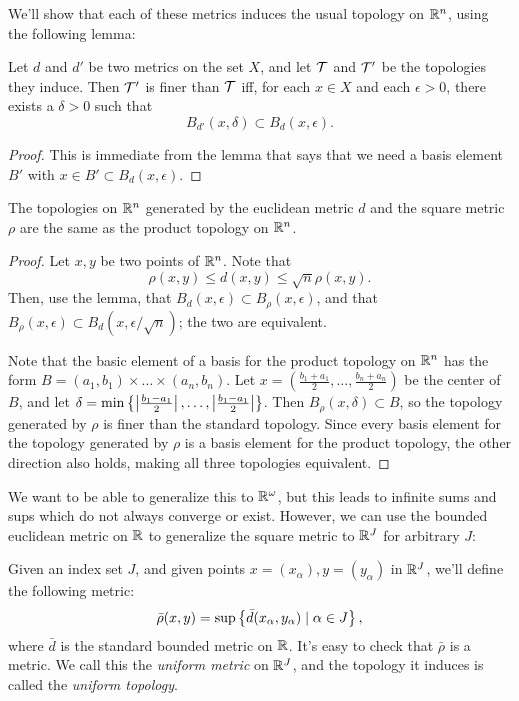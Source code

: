\documentclass[10pt]{report}
\begin{document}
We'll show that each of these metrics induces the usual topology on $\mathbb{R}^n$, using the following lemma:

\begin{lemma}
  Let $d$ and $d'$ be two metrics on the set $X$, and let $\mathcal{T}$ and $\mathcal{T}'$ be the topologies they induce.
  Then $\mathcal{T}'$ is finer than $\mathcal{T}$ iff, for each $x \in X$ and each $\epsilon > 0$, there exists a $\delta > 0$ such that
  \[ B_{d'}(x,\delta) \subset B_d(x,\epsilon).\]
\end{lemma}
\begin{proof}
  This is immediate from the lemma that says that we need a basis element $B'$ with $x \in B' \subset B_d(x,\epsilon)$. 
\end{proof}

\begin{theorem}
  The topologies on $\mathbb{R}^n$ generated by the euclidean metric $d$ and the square metric $\rho$ are the same as the product topology on $\mathbb{R}^n$.
\end{theorem}
\begin{proof}
  Let $x,y$ be two points of $\mathbb{R}^n$.
  Note that
  \[ \rho(x,y) \leq d(x,y) \leq \sqrt{n} \rho(x,y) .\]
  Then, use the lemma, that $B_d(x,\epsilon) \subset B_\rho(x,\epsilon)$, and that $B_\rho(x,\epsilon) \subset B_d(x,\epsilon/\sqrt{n})$; the two are equivalent.

  Note that the basic element of a basis for the product topology on $\mathbb{R}^n$ has the form $B = (a_1,b_1)\times\dots\times(a_n,b_n)$.
  Let $x = (\frac{b_1 + a_1}{2},\dots,\frac{b_n + a_n}{2})$ be the center of $B$, and let $\delta = \min \left\{ \left| \frac{b_1 - a_1}{2} \right|,\dots,\left| \frac{b_1 - a_1}{2} \right| \right\}$.
  Then $B_\rho(x,\delta) \subset B$, so the topology generated by $\rho$ is finer than the standard topology.
  Since every basis element for the topology generated by $\rho$ is a basis element for the product topology, the other direction also holds, making all three topologies equivalent.
\end{proof}

We want to be able to generalize this to $\mathbb{R}^\omega$, but this leads to infinite sums and sups which do not always converge or exist.
However, we can use the bounded euclidean metric on $\mathbb{R}$ to generalize the square metric to $\mathbb{R}^J$ for arbitrary $J$:

\begin{definition}
  Given an index set $J$, and given points $x = (x_\alpha), y = (y_\alpha)$ in $\mathbb{R}^J$, we'll define the following metric:
  \[ \bar \rho (x,y) = \sup \left\{  \bar d(x_\alpha,y_\alpha) \mid \alpha \in J \right\}, \]
  where $\bar d$ is the standard bounded metric on $\mathbb{R}$.
  It's easy to check that $\bar \rho$ is a metric.
  We call this the \emph{uniform metric} on $\mathbb{R}^J$, and the topology it induces is called the \emph{uniform topology}.
\end{definition}
\end{document}

